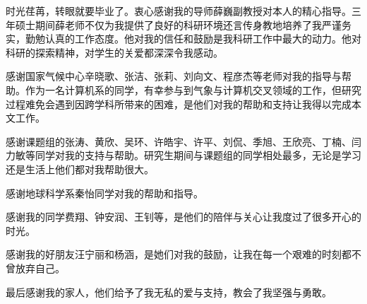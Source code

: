 \begin{acknowledgement}
时光荏苒，转眼就要毕业了。衷心感谢我的导师薛巍副教授对本人的精心指导。三年硕士期间薛老师不仅为我提供了良好的科研环境还言传身教地培养了我严谨务实，勤勉认真的工作态度。他对我的信任和鼓励是我科研工作中最大的动力。他对科研的探索精神，对学生的关爱都深深令我感动。

感谢国家气候中心辛晓歌、张洁、张莉、刘向文、程彦杰等老师对我的指导与帮助。作为一名计算机系的同学，有幸参与到气象与计算机交叉领域的工作，但研究过程难免会遇到因跨学科所带来的困难，是他们对我的帮助和支持让我得以完成本文工作。

感谢课题组的张涛、黄欣、吴环、许皓宇、许平、刘侃、季旭、王欣亮、丁楠、闫力敏等同学对我的支持与帮助。研究生期间与课题组的同学相处最多，无论是学习还是生活上他们都对我帮助很大。

感谢地球科学系秦怡同学对我的帮助和指导。

感谢我的同学费翔、钟安润、王钊等，是他们的陪伴与关心让我度过了很多开心的时光。

感谢我的好朋友汪宁丽和杨涵，是她们对我的鼓励，让我在每一个艰难的时刻都不曾放弃自己。

最后感谢我的家人，他们给予了我无私的爱与支持，教会了我坚强与勇敢。

\end{acknowledgement}
